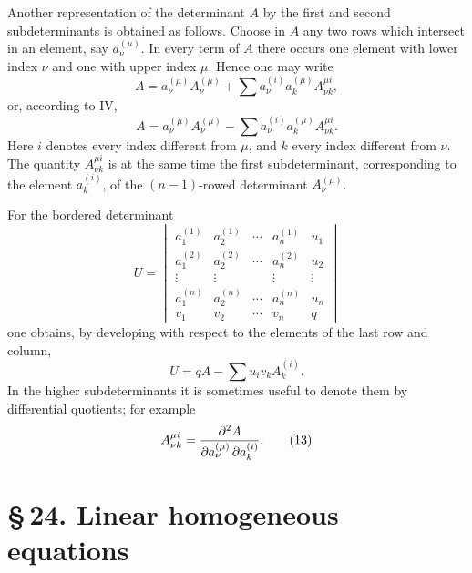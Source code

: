 \documentclass[11pt]{article}
\begin{document}
Another representation of the determinant \(A\) by the first and second subdeterminants is obtained as follows.  Choose in \(A\) any two rows which intersect in an element, say \(a_\nu^{(\mu)}\).  In every term of \(A\) there occurs one element with lower index \(\nu\) and one with upper index \(\mu\).  Hence one may write
\begin{equation}
        A=a_\nu^{(\mu)}A_\nu^{(\mu)}+
        \sum a_\nu^{(i)}a_k^{(\mu)}A_{\nu k}^{\mu i},
\tag{9}
\end{equation}
or, according to IV,
\begin{equation}
        A=a_\nu^{(\mu)}A_\nu^{(\mu)}-
        \sum a_\nu^{(i)}a_k^{(\mu)}A_{\nu k}^{\mu i}.
\tag{10}
\end{equation}
Here \(i\) denotes every index different from \(\mu\), and \(k\) every index different from \(\nu\).  The quantity \(A_{\nu k}^{\mu i}\) is at the same time the first subdeterminant, corresponding to the element \(a_k^{(i)}\), of the \((n-1)\)-rowed determinant \(A_\nu^{(\mu)}\).

For the bordered determinant
\begin{equation}
        U=\begin{vmatrix}
        a_1^{(1)}&a_2^{(1)}&\cdots&a_n^{(1)}&u_1\\
        a_1^{(2)}&a_2^{(2)}&\cdots&a_n^{(2)}&u_2\\
        \vdots&\vdots&&\vdots&\vdots\\
        a_1^{(n)}&a_2^{(n)}&\cdots&a_n^{(n)}&u_n\\
        v_1&v_2&\cdots&v_n&q
        \end{vmatrix}
\tag{11}
\end{equation}
one obtains, by developing with respect to the elements of the last row and column,
\begin{equation}
        U=qA-\sum u_i v_k A_k^{(i)}.
\tag{12}
\end{equation}
In the higher subdeterminants it is sometimes useful to denote them by differential quotients; for example
\begin{equation}
        A_{\nu k}^{\mu i}=
        {\partial^2 A\over \partial a_\nu^{(\mu)}\,\partial a_k^{(i)}} .
\tag{13}
\end{equation}

\section*{\S\,24. Linear homogeneous equations}
\end{document}
